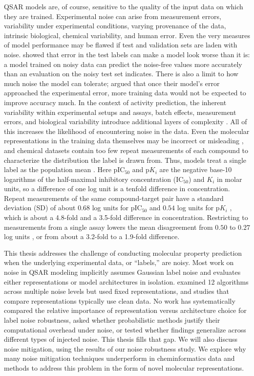 QSAR models are, of course, sensitive to the quality of the input data on which they are trained. Experimental noise can arise from measurement errors, variability under experimental conditions, varying provenance of the data, intrinsic biological, chemical variability, and human error. Even the very measures of model performance may be flawed if test and validation sets are laden with noise. \citet{Kolmar2021} showed that error in the test labels can make a model look worse than it is: a model trained on noisy data can predict the noise-free values more accurately than an evaluation on the noisy test set indicates. There is also a limit to how much noise the model can tolerate; \citet{jorner2021} argued that once their model's error approached the experimental error, more training data would not be expected to improve accuracy much. In the context of activity prediction, the inherent variability within experimental setups and assays, batch effects, measurement errors, and biological variability introduce additional layers of complexity \citep{Kolmar2021, Kramer2012, Kalliokoski2013}. All of this increases the likelihood of encountering noise in the data. Even the molecular representations in the training data themselves may be incorrect or misleading \citep{Fourches2010, Walters2023}, and chemical datasets contain too few repeat measurements of each compound to characterize the distribution the label is drawn from. Thus, models treat a single label as the population mean \citep{Kolmar2021}. Here pIC$_{50}$ and p$K_i$ are the negative base-10 logarithms of the half-maximal inhibitory concentration (IC$_{50}$) and $K_i$ in molar units, so a difference of one log unit is a tenfold difference in concentration. Repeat measurements of the same compound-target pair have a standard deviation (SD) of about $0.68$ log units for pIC$_{50}$ and $0.54$ log units for p$K_i$ \citep{Kalliokoski2013, Kramer2012}, which is about a 4.8-fold and a 3.5-fold difference in concentration. Restricting to measurements from a single assay lowers the mean disagreement from $0.50$ to $0.27$ log units \citep{landrum2024}, or from about a 3.2-fold to a 1.9-fold difference.

This thesis addresses the challenge of conducting molecular property prediction when the underlying experimental data, or ``labels,'' are noisy. Most work on noise in QSAR modeling implicitly assumes Gaussian label noise and evaluates either representations or model architectures in isolation. \citet{Cortes2015} examined 12 algorithms across multiple noise levels but used fixed representations, and studies that compare representations typically use clean data. No work has systematically compared the relative importance of representation versus architecture choice for label noise robustness, asked whether probabilistic methods justify their computational overhead under noise, or tested whether findings generalize across different types of injected noise. This thesis fills that gap. We will also discuss noise mitigation, using the results of our noise robustness study. We explore why many noise mitigation techniques underperform in cheminformatics data and methods to address this problem in the form of novel molecular representations.

